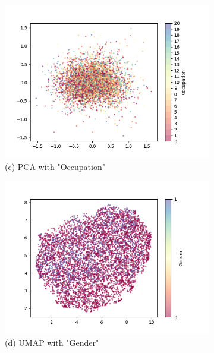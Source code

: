 \documentclass{article}
\begin{document}
\begin{figure}[H]
    \begin{subfigure}{0.49\textwidth}
        \includegraphics[width=\textwidth]{fig/pca_occ.png}
        \caption*{(c) PCA with "Occupation"}
    \end{subfigure}
    \begin{subfigure}{0.49\textwidth}
        \includegraphics[width=\textwidth]{fig/umap_gender.png}
        \caption*{(d) UMAP with "Gender"}
    \end{subfigure}
    \begin{subfigure}{0.49\textwidth}

\end{subfigure}
\end{figure}
\end{document}
